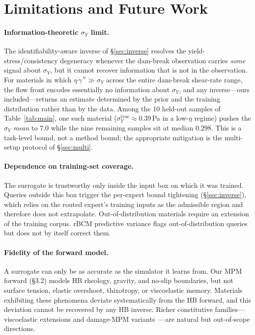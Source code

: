 \section{Limitations and Future Work}
\label{sec:limitations}

\paragraph{Information-theoretic $\sigma_Y$ limit.}
The identifiability-aware inverse of \S\ref{sec:inverse} resolves
the yield-stress/consistency degeneracy whenever the dam-break
observation carries \emph{some} signal about $\sigma_Y$, but it
cannot recover information that is not in the observation. For
materials in which $\eta\,\dot\gamma^{\,n} \gg \sigma_Y$ across the
entire dam-break shear-rate range, the flow front encodes
essentially no information about $\sigma_Y$, and any inverse---ours
included---returns an estimate determined by the prior and the
training distribution rather than by the data. Among the $10$
held-out samples of Table~\ref{tab:main}, one such material
($\sigma_Y^{\mathrm{true}} \approx 0.39$\,Pa in a low-$\eta$ regime)
pushes the $\sigma_Y$ \emph{mean} to $7.0$ while the nine remaining
samples sit at median $0.298$. This is a task-level bound, not a
method bound; the appropriate mitigation is the multi-setup protocol
of \S\ref{sec:multi}.

\paragraph{Dependence on training-set coverage.}
The surrogate is trustworthy only inside the input box on which it
was trained. Queries outside this box trigger the per-expert bound
tightening (\S\ref{sec:inverse}), which relies on the routed
expert's training inputs as the admissible region and therefore
does not extrapolate. Out-of-distribution materials require an
extension of the training corpus. rBCM predictive variance flags
out-of-distribution queries but does not by itself correct them.

\paragraph{Fidelity of the forward model.}
A surrogate can only be as accurate as the simulator it learns from.
Our MPM forward (\S3.2) models HB rheology, gravity, and no-slip
boundaries, but not surface tension, elastic overshoot, thixotropy,
or viscoelastic memory. Materials exhibiting these phenomena deviate
systematically from the HB forward, and this deviation cannot be
recovered by any HB inverse. Richer constitutive
families---viscoelastic extensions and damage-MPM
variants~\cite{wolper2019cdmpm}---are natural but out-of-scope
directions.

